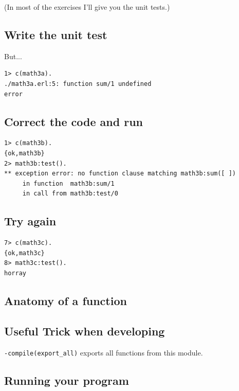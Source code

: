\documentclass[12pt]{article}
\begin{document}
(In most of the exercises I'll give you the unit tests.)

\subsection{Write the unit test}



But...

\begin{verbatim}
1> c(math3a).
./math3a.erl:5: function sum/1 undefined
error
\end{verbatim}

\subsection{Correct the code and run}



\begin{verbatim}
1> c(math3b).
{ok,math3b}
2> math3b:test().
** exception error: no function clause matching math3b:sum([ ])
     in function  math3b:sum/1
     in call from math3b:test/0
\end{verbatim}

\subsection{Try again}



\begin{verbatim}
7> c(math3c).     
{ok,math3c}
8> math3c:test().
horray
\end{verbatim}

\subsection{Anatomy of a function}



\subsection{Useful Trick when developing}

\verb+-compile(export_all)+ exports all functions from this module.

\subsection{Running your program}
\end{document}
